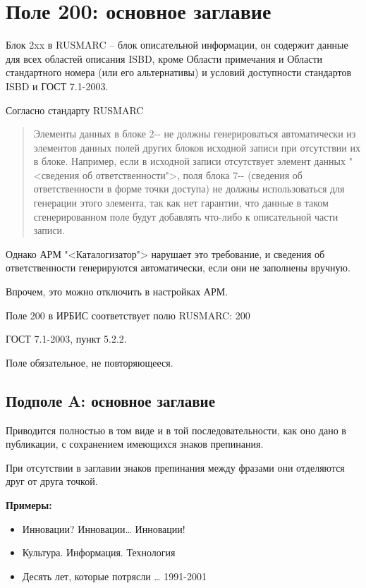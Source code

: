 \chapter{Поле 200: основное заглавие}

Блок 2xx в RUSMARC -- блок описательной информации, он содержит данные для всех областей описания ISBD, кроме Области примечания и Области стандартного номера (или его альтернативы) и условий доступности стандартов ISBD и ГОСТ 7.1-2003. 

Согласно стандарту RUSMARC

\begin{quotation}
	Элементы данных в блоке 2{-}{-} не должны генерироваться автоматически из элементов данных полей других блоков исходной записи при отсутствии их в блоке. Например, если в исходной записи отсутствует элемент данных "<сведения об ответственности">, поля блока 7{-}{-} (сведения об ответственности в форме точки доступа) не должны использоваться для генерации этого элемента, так как нет гарантии, что данные в таком сгенерированном поле будут добавлять что-либо к описательной части записи.
\end{quotation}

Однако АРМ "<Каталогизатор"> нарушает это требование, и сведения об ответственности генерируются автоматически, если они не заполнены вручную.

Впрочем, это можно отключить в настройках АРМ.

Поле 200 в ИРБИС соответствует полю RUSMARC: 200

ГОСТ 7.1-2003, пункт 5.2.2.

Поле обязательное, не повторяющееся.

\section{Подполе A: основное заглавие}

Приводится полностью в том виде и в той последовательности, как оно дано в публикации, с сохранением имеющихся знаков препинания.

При отсутствии в заглавии знаков препинания между фразами они отделяются друг от друга точкой.

\textbf{Примеры:}

\begin{itemize}
	\item Инновации? Инновации… Инновации!
	\item Культура. Информация. Технология
	\item Десять лет, которые потрясли … 1991-2001
\end{itemize}

